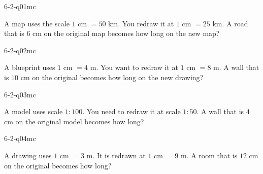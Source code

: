 

\begin{practiceQuestion}{6-2-q01}{mc}
\begin{questionText}
A map uses the scale $1$ cm $= 50$ km. You redraw it at $1$ cm $= 25$ km. A road that is $6$ cm on the original map becomes how long on the new map?
\end{questionText}
\end{practiceQuestion}

\begin{practiceQuestion}{6-2-q02}{mc}
\begin{questionText}
A blueprint uses $1$ cm $= 4$ m. You want to redraw it at $1$ cm $= 8$ m. A wall that is $10$ cm on the original becomes how long on the new drawing?
\end{questionText}
\end{practiceQuestion}

\begin{practiceQuestion}{6-2-q03}{mc}
\begin{questionText}
A model uses scale $1:100$. You need to redraw it at scale $1:50$. A wall that is $4$ cm on the original model becomes how long?
\end{questionText}
\end{practiceQuestion}

\begin{practiceQuestion}{6-2-q04}{mc}
\begin{questionText}
A drawing uses $1$ cm $= 3$ m. It is redrawn at $1$ cm $= 9$ m. A room that is $12$ cm on the original becomes how long?
\end{questionText}
\end{practiceQuestion}

